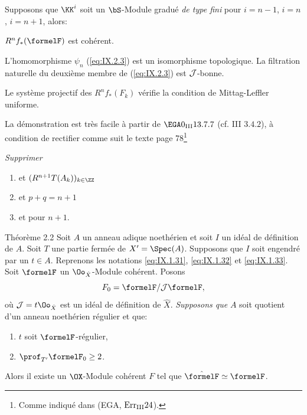 \begin{theoreme} \label{IX.2.1}
Supposons que $\KK^i$ soit un $\bS$-Module gradu\'e \emph{de type fini} pour $i=n-1$, $i=n$, $i=n+1$, alors:
\begin{enumeratei}
\item
$R^nf_*(\formelF)$ est coh\'erent.
\item
L'homomorphisme $\psi_n$ (\ref{eq:IX.2.3}) est un isomorphisme topologique. La filtration naturelle du deuxi\`eme membre de (\ref{eq:IX.2.3}) est ${\mathcal J}$-bonne.
\item
Le syst\`eme projectif des $R^nf_*(F_k)$ v\'erifie la condition de Mittag-Leffler uniforme.
\end{enumeratei}
\end{theoreme}

La d\'emonstration est tr\`es facile \`a partir de $\EGA 0_{\textup{III}} 13.7.7$ (cf. \EGA III $3.4.2$), \`a condition de rectifier comme suit le texte page 78\footnote{Comme indiqu\'e dans (EGA, $\rm{Err}_{\rm{III}}24$).}
\par
\emph{Supprimer}\begin{enumerate}
\item[ligne 6] \og et $(R^{n+1}T(A_k))_{k\in \ZZ}$\fg\
\item[ligne 13] \og et $p+q=n+1$\fg\
\item[ligne 23] \og et pour $n+1$\fg.
\end{enumerate}

\setcounter{equation}{7}
\label{IX.2.2}
\begin{enonce*}{Th\'eor\`eme 2.2\ndemark}
Soit $A$ un anneau adique noeth\'erien et soit $I$ un id\'eal de d\'efinition de $A$. Soit $T$ une partie ferm\'ee de $X'=\Spec(A)$. Supposons que $I$ soit engendr\'e par un $t \in A$. Reprenons les notations \ref{eq:IX.1.31}, \ref{eq:IX.1.32} et \ref{eq:IX.1.33}. Soit $\formelF$ un $\Oo_{\hat{X}}$-Module coh\'erent. Posons 
\begin{equation} \label{eq:IX.2.8}
F_0=\formelF / {\Jb} \formelF,
\end{equation}
o\`u ${\Jb}=t \Oo_{\hat{X}}$ est un id\'eal de d\'efinition de $\hat{X}$. \emph{Supposons que} $A$ soit quotient d'un anneau noeth\'erien r\'egulier et que:
\begin{enumerate}
\item
$t$ soit $\formelF$-r\'egulier,
\item
$\prof_{T'}\formelF_0\geq 2$.
\end{enumerate}
\noindent
Alors il existe un $\OX$-Module coh\'erent $F$ tel que $\hat{\formelF}\simeq \formelF$.
\end{enonce*}

